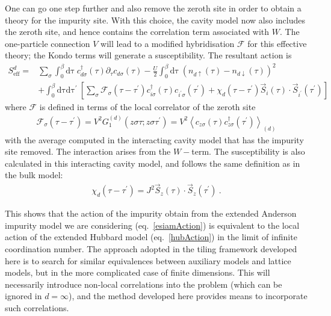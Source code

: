 One can go one step further and also remove the zeroth site in order to obtain a theory for the impurity site. With this choice, the cavity model now also includes the zeroth site, and hence contains the correlation term associated with \(W\). The one-particle connection \(V\) will lead to a modified hybridisation \(\mathcal{F}\) for this effective theory; the Kondo terms will generate a susceptibility. The resultant action is
\begin{equation}\begin{aligned}\label{esiamAction}
	S^{d}_\text{eff} =& \sum_\sigma \int_0^\beta\mathrm{d\tau}~c^\dagger_{d\sigma}(\tau)\partial_\tau c_{d\sigma}(\tau) - \frac{U}{2}\int_0^\beta\mathrm{d\tau}~\left(n_{d\uparrow}(\tau) - n_{d\downarrow}(\tau)\right)^2 \\
			  &+ \int_0^\beta\mathrm{d\tau}\mathrm{d\tau^\prime}~\left[\sum_{\sigma}\mathcal{F}_{\sigma}(\tau - \tau^\prime)c^\dagger_{i\sigma}(\tau)c_{i^\prime\sigma}(\tau^\prime) + \chi_{d}(\tau - \tau^\prime)\vec{S}_{i}(\tau)\cdot\vec{S}_{i^\prime}(\tau^\prime)\right]
\end{aligned}\end{equation}
where \(\mathcal{F}\) is defined in terms of the local correlator of the zeroth site
\begin{equation}\begin{aligned}
	\mathcal{F}_\sigma(\tau - \tau^\prime) = V^2 G_1^{(d)}\left(z\sigma\tau; z\sigma\tau^\prime\right) = V^2 \left<c_{z\sigma}(\tau)c^\dagger_{z\sigma}(\tau^\prime)\right>_{(d)}
\end{aligned}\end{equation}
with the average computed in the interacting cavity model that has the impurity site removed. The interaction arises from the \(W-\)term. The susceptibility is also calculated in this interacting cavity model, and follows the same definition as in the bulk model:
\begin{equation}\begin{aligned}
	\chi_{d}(\tau - \tau^\prime) = J^2\vec{S}_{z}(\tau)\cdot\vec{S}_{z}(\tau^\prime)~.
\end{aligned}\end{equation}

This shows that the action of the impurity obtain from the extended Anderson impurity model we are considering (eq.~\ref{esiamAction}) is equivalent to the local action of the extended Hubbard model (eq.~\ref{hubAction}) in the limit of infinite coordination number. The approach adopted in the tiling framework developed here is to search for similar equivalences between auxiliary models and lattice models, but in the more complicated case of finite dimensions. This will necessarily introduce non-local correlations into the problem (which can be ignored in \(d=\infty\)), and the method developed here provides means to incorporate such correlations.
